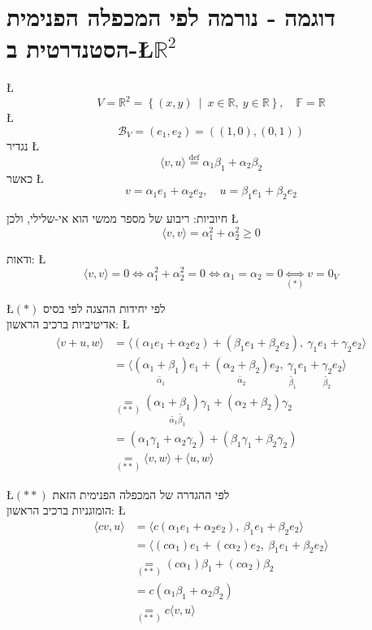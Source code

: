 \documentclass[english,hebrew]{article}
\begin{document}
\section{דוגמה - נורמה לפי המכפלה הפנימית הסטנדרטית ב-\L{$\mathbb{R}^{2}$}}

\L{%
\[
V=\mathbb{R}^{2}=\left\{ (x,y)\ \middle|\ x\in\mathbb{R},\ y\in\mathbb{R}\right\} ,\quad\mathbb{F}=\mathbb{R}
\]
}%
\L{%
\[
\mathcal{B}_{V}=(e_{1},e_{2})=\left((1,0),(0,1)\right)
\]
}%
נגדיר \L{%
\[
\langle v,u\rangle\overset{\text{def}}{=}\alpha_{1}\beta_{1}+\alpha_{2}\beta_{2}
\]
}%
כאשר \L{%
\[
v=\alpha_{1}e_{1}+\alpha_{2}e_{2},\quad u=\beta_{1}e_{1}+\beta_{2}e_{2}
\]
}%

חיוביות: ריבוע של מספר ממשי הוא אי-שלילי, ולכן \L{%
\[
\langle v,v\rangle=\alpha_{1}^{2}+\alpha_{2}^{2}\geq0
\]
}%

ודאות: \L{%
\[
\langle v,v\rangle=0\iff\alpha_{1}^{2}+\alpha_{2}^{2}=0\iff\alpha_{1}=\alpha_{2}=0\underset{\left(*\right)}{\iff}v=0_{V}
\]
}%

\L{$\left(*\right)$} לפי יחידות ההצגה לפי בסיס\\

אדיטיביות ברכיב הראשון: \L{%
\begin{align*}
\langle v+u,w\rangle & =\langle(\alpha_{1}e_{1}+\alpha_{2}e_{2})+(\beta_{1}e_{1}+\beta_{2}e_{2}),\ \gamma_{1}e_{1}+\gamma_{2}e_{2}\rangle\\
 & =\langle\underset{\tilde{\alpha_{1}}}{(\alpha_{1}+\beta_{1})}e_{1}+\underset{\tilde{\alpha_{2}}}{(\alpha_{2}+\beta_{2})}e_{2},\ \underset{\tilde{\beta_{1}}}{\gamma_{1}}e_{1}+\underset{\tilde{\beta_{2}}}{\gamma_{2}}e_{2}\rangle\\
 & \underset{(**)}{=}\underset{\tilde{\alpha_{1}}\tilde{\beta_{1}}}{(\alpha_{1}+\beta_{1})\gamma_{1}}+(\alpha_{2}+\beta_{2})\gamma_{2}\\
 & =(\alpha_{1}\gamma_{1}+\alpha_{2}\gamma_{2})+(\beta_{1}\gamma_{1}+\beta_{2}\gamma_{2})\\
 & \underset{(**)}{=}\langle v,w\rangle+\langle u,w\rangle
\end{align*}
}%

\L{$(**)$} לפי ההגדרה של המכפלה הפנימית הזאת\\

הומוגניות ברכיב הראשון: \L{%
\begin{align*}
\langle cv,u\rangle & =\langle c(\alpha_{1}e_{1}+\alpha_{2}e_{2}),\ \beta_{1}e_{1}+\beta_{2}e_{2}\rangle\\
 & =\langle(c\alpha_{1})e_{1}+(c\alpha_{2})e_{2},\ \beta_{1}e_{1}+\beta_{2}e_{2}\rangle\\
 & \underset{(**)}{=}(c\alpha_{1})\beta_{1}+(c\alpha_{2})\beta_{2}\\
 & =c(\alpha_{1}\beta_{1}+\alpha_{2}\beta_{2})\\
 & \underset{(**)}{=}c\langle v,u\rangle
\end{align*}
}%
\end{document}
